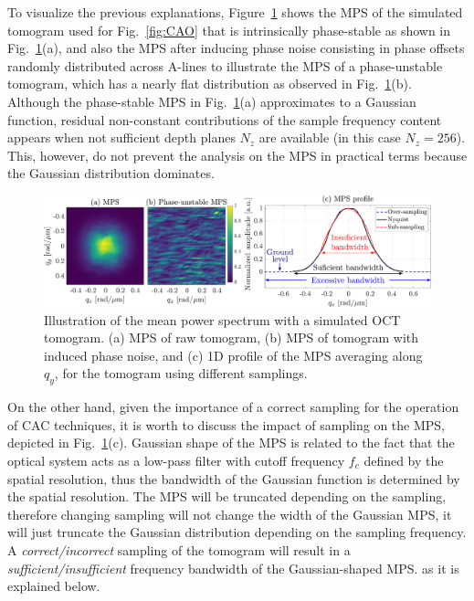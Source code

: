 To visualize the previous explanations, Figure~\ref{fig:MPSExample} shows the MPS of the simulated tomogram used for Fig.~\ref{fig:CAO} that is intrinsically phase-stable as shown in Fig.~\ref{fig:MPSExample}(a), and also the MPS after inducing phase noise consisting in phase offsets randomly distributed across A-lines to illustrate the MPS of a phase-unstable tomogram, which has a nearly flat distribution as observed in Fig.~\ref{fig:MPSExample}(b). Although the phase-stable MPS in Fig.~\ref{fig:MPSExample}(a) approximates to a Gaussian function, residual non-constant contributions of the sample frequency content appears when not sufficient depth planes $N_z$ are available (in this case $N_z = 256$). This, however, do not prevent the analysis on the MPS in practical terms because the Gaussian distribution dominates.

\begin{figure}[htb!]
	\centering
	\includegraphics[width=\textwidth]{Figures/SHARP/PhaseStabilization/MPSExample.pdf}
	\caption[Illustration of the mean power spectrum with a simulated OCT tomogram.]{Illustration of the mean power spectrum with a simulated OCT tomogram. (a) MPS of raw tomogram, (b) MPS of tomogram with induced phase noise, and (c) 1D profile of the MPS averaging along $q_y$, for the tomogram using different samplings.}
	\label{fig:MPSExample}
\end{figure}

On the other hand, given the importance of a correct sampling for the operation of CAC techniques, it is worth to discuss the impact of sampling on the MPS, depicted in Fig.~\ref{fig:MPSExample}(c). Gaussian shape of the MPS is related to the fact that the optical system acts as a low-pass filter with cutoff frequency $f_c$ defined by the spatial resolution, thus the bandwidth of the Gaussian function is determined by the spatial resolution. The MPS will be truncated depending on the sampling, therefore changing sampling will not change the width of the Gaussian MPS, it will just truncate the Gaussian distribution depending on the sampling frequency. A \textit{correct/incorrect} sampling of the tomogram will result in a \textit{sufficient/insufficient} frequency bandwidth of the Gaussian-shaped MPS. as it is explained below.

